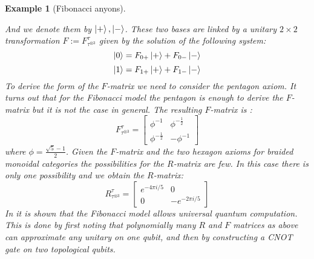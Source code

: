 \documentclass{article}
\newtheorem{example}{Example}
\begin{document}
\begin{example}[Fibonacci anyons]
\begin{center}
		\quad
	\end{center}
	And we denote them by $\ket{+}, \ket{-}$. These two bases are linked by a unitary $2 \times 2$ transformation $F:= F^\tau_{\tau^{\otimes 3}}$ given by the solution of the following system:
	$$ \ket{0} = F_{0+} \ket{+} + F_{0-} \ket{-}$$
	$$ \ket{1} = F_{1+} \ket{+} + F_{1-} \ket{-}$$
	To derive the form of the $F$-matrix we need to consider the pentagon axiom. It turns out that for the Fibonacci model the pentagon is enough to derive the $F$-matrix but it is not the case in general. The resulting $F$-matrix is \cite{Simon16}:
	\begin{equation}
	F^\tau_{\tau^{\otimes 3}} =
	\begin{bmatrix}
	\phi^{-1} & \phi^{-\frac{1}{2}} \\
	\phi^{-\frac{1}{2}} & -\phi^{-1}
	\end{bmatrix}
	\end{equation}
	where $\phi = \frac{\sqrt{5}-1}{2}$. Given the $F$-matrix and the two hexagon axioms for braided monoidal categories the possibilities for the $R$-matrix are few. In this case there is only one possibility and we obtain the $R$-matrix:
	\begin{equation}
	R^\tau_{\tau^{\otimes 3}} = 
	\begin{bmatrix}
	e^{-4\pi i/ 5} & 0 \\
	0 & -e^{-2\pi i/ 5} 
	\end{bmatrix}
	\end{equation}
	In \cite{Panangaden11} it is shown that the Fibonacci model allows universal quantum computation. This is done by first noting that polynomially many $R$ and $F$ matrices as above can approximate any unitary on one qubit, and then by constructing a CNOT gate on two topological qubits.
\end{example}
\end{document}

